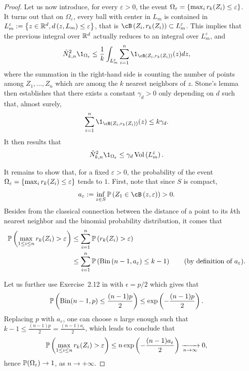 \documentclass[twoside]{article}
\DeclareMathOperator{\vol}{Vol}
\theoremstyle{definition}
\theoremstyle{remark}
\newcommand{\kvv}{z} %
\newcommand{\KVV}{Z} %
\begin{document}
\begin{proof}
Let us now introduce, for every $\varepsilon>0$, the event $\Omega_\varepsilon = \set{\max_i r_k(Z_i) \leq \varepsilon}$.
%
It turns out that on $\Omega_\varepsilon$, every ball with center in $L_m$ is contained in $L_m^\varepsilon:= \set{\kvv\in\R^d, d\pa{\kvv, L_m} \leq \varepsilon} $, that is $\cB\pa{\KVV_i,r_k(\KVV_i)} \subset L_m^\varepsilon $.
%
This implies that the previous integral over $\R^d$ actually reduces to an integral over $L_m^\varepsilon$, and 
\begin{align*}
    \hat{N}_{k,n}^2  \1_{\Omega_\varepsilon} \leq \frac{1}{k} \int_{L_m^\varepsilon} \sum_{i=1}^n \1_{\cB\pa{\KVV_i,r_k(\KVV_i)}}(\kvv) d \kvv ,
\end{align*}
where the summation in the right-hand side is counting the number of points among $Z_1,\ldots,Z_n$ which are among the $k$ nearest neighbors of $z$.
% 
Stone's lemma \citep[Corrollary 6.1]{gyorfiDistributionFreeTheoryNonparametric2002} then establishes that there exists a constant $\gamma_d>0$ only depending on $d$ such that, almost surely,
\begin{align*}
\sum_{i=1}^n \1_{\cB\pa{\KVV_i,r_k(\KVV_i)}}(\kvv) \leq k \gamma_d .    
\end{align*}
%
It then results that
\begin{equation}\label{eq:bound_hat_N_small_density}
\hat{N}_{k,n}^2  \1_{\Omega_\varepsilon} \leq \gamma_d \vol\pa{L_m^\varepsilon} .
\end{equation}

\bigskip

%
It remains to show that, for a fixed $\varepsilon>0$, the probability of the event $\Omega_\varepsilon =\set{\max_i r_k(\KVV_i) \leq \varepsilon}$ tends to $1$.
%
First, note that since $S$ is compact, 
\[a_\varepsilon := \inf_{z\in S}\P \pa{\KVV_1 \in \cB\pa{\kvv, \varepsilon}} > 0.\]
%
Besides from the classical connection between the distance of a point to its $k$th nearest neighbor and the binomial probability distribution, it comes that
\begin{align*}
    \P\pa{\max_{1\leq i \leq n} r_k(\KVV_i) > \varepsilon} &\leq \sum_{i=1}^n \P \pa{r_k (\KVV_i) > \varepsilon} \\
    &\leq \sum_{i=1}^n \P \pa{\mathrm{Bin}\pa{n-1, a_\varepsilon} \leq k-1} \qquad \text{(by definition of $a_\varepsilon$)}.
\end{align*}

Let us further use Exercise~2.12 in \citep{boucheron2013concentration} with $\epsilon=p/2$ which gives that
\[
\P\pa{\mathrm{Bin}(n-1,p) \leq \frac{(n-1)p}{2}} \leq \exp\pa{- \frac{(n-1)p}{2}}.
\]
Replacing $p$ with $a_\varepsilon$, one can choose $n$ large enough such that $k - 1 \leq \frac {(n-1)p}{2} = \frac{(n-1) a_\varepsilon}{2}$, which leads to conclude that
\begin{align*}
\P\pa{\max_{1\leq i \leq n} r_k(\KVV_i) > \varepsilon} \leq n \exp\pa{-\frac{(n-1)a_\varepsilon}{2}} \xra{n\to \infty} 0,
\end{align*}
hence $\P(\Omega_\varepsilon) \to 1$, as $n\to +\infty$.


\end{proof}
\end{document}
